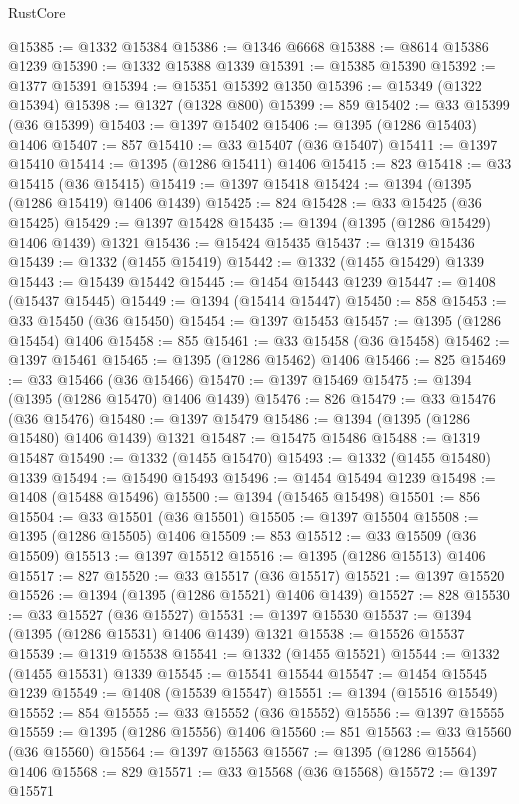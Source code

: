 \begin{lexlean}{RustCore}
\begin{coremodule}
@15385 := @1332 @15384
@15386 := @1346 @6668
@15388 := @8614 @15386 @1239
@15390 := @1332 @15388 @1339
@15391 := @15385 @15390
@15392 := @1377 @15391
@15394 := @15351 @15392 @1350
@15396 := @15349 (@1322 @15394)
@15398 := @1327 (@1328 @800)
@15399 := 859
@15402 := @33 @15399 (@36 @15399)
@15403 := @1397 @15402
@15406 := @1395 (@1286 @15403) @1406
@15407 := 857
@15410 := @33 @15407 (@36 @15407)
@15411 := @1397 @15410
@15414 := @1395 (@1286 @15411) @1406
@15415 := 823
@15418 := @33 @15415 (@36 @15415)
@15419 := @1397 @15418
@15424 := @1394 (@1395 (@1286 @15419) @1406 @1439)
@15425 := 824
@15428 := @33 @15425 (@36 @15425)
@15429 := @1397 @15428
@15435 := @1394 (@1395 (@1286 @15429) @1406 @1439) @1321
@15436 := @15424 @15435
@15437 := @1319 @15436
@15439 := @1332 (@1455 @15419)
@15442 := @1332 (@1455 @15429) @1339
@15443 := @15439 @15442
@15445 := @1454 @15443 @1239
@15447 := @1408 (@15437 @15445)
@15449 := @1394 (@15414 @15447)
@15450 := 858
@15453 := @33 @15450 (@36 @15450)
@15454 := @1397 @15453
@15457 := @1395 (@1286 @15454) @1406
@15458 := 855
@15461 := @33 @15458 (@36 @15458)
@15462 := @1397 @15461
@15465 := @1395 (@1286 @15462) @1406
@15466 := 825
@15469 := @33 @15466 (@36 @15466)
@15470 := @1397 @15469
@15475 := @1394 (@1395 (@1286 @15470) @1406 @1439)
@15476 := 826
@15479 := @33 @15476 (@36 @15476)
@15480 := @1397 @15479
@15486 := @1394 (@1395 (@1286 @15480) @1406 @1439) @1321
@15487 := @15475 @15486
@15488 := @1319 @15487
@15490 := @1332 (@1455 @15470)
@15493 := @1332 (@1455 @15480) @1339
@15494 := @15490 @15493
@15496 := @1454 @15494 @1239
@15498 := @1408 (@15488 @15496)
@15500 := @1394 (@15465 @15498)
@15501 := 856
@15504 := @33 @15501 (@36 @15501)
@15505 := @1397 @15504
@15508 := @1395 (@1286 @15505) @1406
@15509 := 853
@15512 := @33 @15509 (@36 @15509)
@15513 := @1397 @15512
@15516 := @1395 (@1286 @15513) @1406
@15517 := 827
@15520 := @33 @15517 (@36 @15517)
@15521 := @1397 @15520
@15526 := @1394 (@1395 (@1286 @15521) @1406 @1439)
@15527 := 828
@15530 := @33 @15527 (@36 @15527)
@15531 := @1397 @15530
@15537 := @1394 (@1395 (@1286 @15531) @1406 @1439) @1321
@15538 := @15526 @15537
@15539 := @1319 @15538
@15541 := @1332 (@1455 @15521)
@15544 := @1332 (@1455 @15531) @1339
@15545 := @15541 @15544
@15547 := @1454 @15545 @1239
@15549 := @1408 (@15539 @15547)
@15551 := @1394 (@15516 @15549)
@15552 := 854
@15555 := @33 @15552 (@36 @15552)
@15556 := @1397 @15555
@15559 := @1395 (@1286 @15556) @1406
@15560 := 851
@15563 := @33 @15560 (@36 @15560)
@15564 := @1397 @15563
@15567 := @1395 (@1286 @15564) @1406
@15568 := 829
@15571 := @33 @15568 (@36 @15568)
@15572 := @1397 @15571

\end{coremodule}
\end{lexlean}
